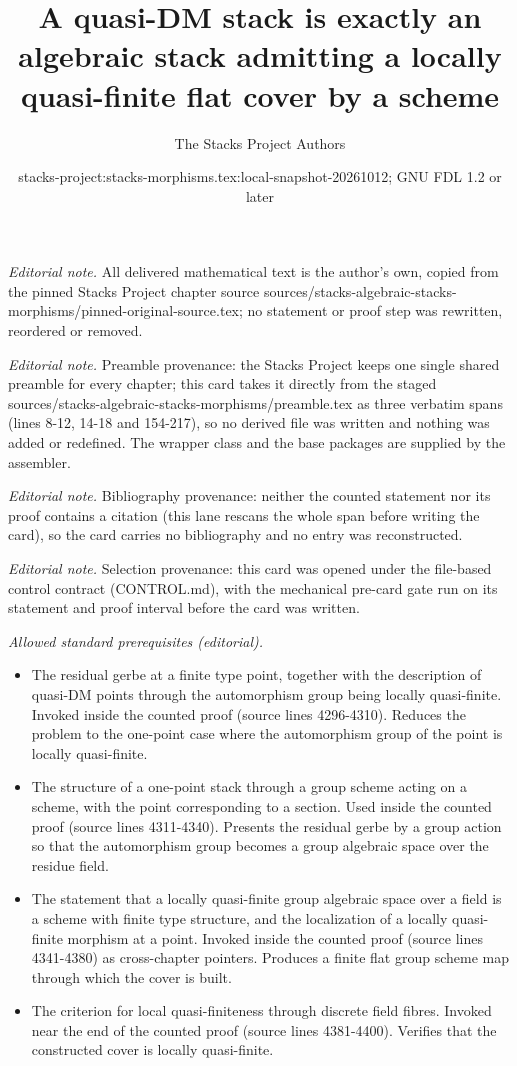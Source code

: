 \documentclass[10pt,a4paper]{amsart}
\title{A quasi-DM stack is exactly an algebraic stack admitting a locally quasi-finite flat cover by a scheme}
\author{The Stacks Project Authors}
\date{stacks-project:stacks-morphisms.tex:local-snapshot-20261012; GNU FDL 1.2 or later}
\theoremstyle{plain}
\theoremstyle{definition}
\theoremstyle{remark}
\numberwithin{equation}{subsection}
\begin{document}
\maketitle
\noindent\textit{Editorial note.} All delivered mathematical text is the author's own, copied from the pinned Stacks Project chapter source sources/stacks-algebraic-stacks-morphisms/pinned-original-source.tex; no statement or proof step was rewritten, reordered or removed.\par\medskip
\noindent\textit{Editorial note.} Preamble provenance: the Stacks Project keeps one single shared preamble for every chapter; this card takes it directly from the staged sources/stacks-algebraic-stacks-morphisms/preamble.tex as three verbatim spans (lines 8-12, 14-18 and 154-217), so no derived file was written and nothing was added or redefined. The wrapper class and the base packages are supplied by the assembler.\par\medskip
\noindent\textit{Editorial note.} Bibliography provenance: neither the counted statement nor its proof contains a citation (this lane rescans the whole span before writing the card), so the card carries no bibliography and no entry was reconstructed.\par\medskip
\noindent\textit{Editorial note.} Selection provenance: this card was opened under the file-based control contract (CONTROL.md), with the mechanical pre-card gate run on its statement and proof interval before the card was written.\par\medskip
\noindent\textit{Allowed standard prerequisites (editorial).}\begin{itemize}
\item The residual gerbe at a finite type point, together with the description of quasi-DM points through the automorphism group being locally quasi-finite. Invoked inside the counted proof (source lines 4296-4310). Reduces the problem to the one-point case where the automorphism group of the point is locally quasi-finite.
\item The structure of a one-point stack through a group scheme acting on a scheme, with the point corresponding to a section. Used inside the counted proof (source lines 4311-4340). Presents the residual gerbe by a group action so that the automorphism group becomes a group algebraic space over the residue field.
\item The statement that a locally quasi-finite group algebraic space over a field is a scheme with finite type structure, and the localization of a locally quasi-finite morphism at a point. Invoked inside the counted proof (source lines 4341-4380) as cross-chapter pointers. Produces a finite flat group scheme map through which the cover is built.
\item The criterion for local quasi-finiteness through discrete field fibres. Invoked near the end of the counted proof (source lines 4381-4400). Verifies that the constructed cover is locally quasi-finite.
\end{itemize}\medskip
\end{document}
